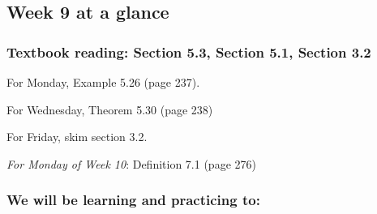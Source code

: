 

\subsection*{Week 9 at a glance}

\vspace{-10pt}

\subsubsection*{Textbook reading: Section 5.3, Section 5.1, Section 3.2}

\vspace{-10pt}

For Monday, Example 5.26 (page 237).

For Wednesday,  Theorem 5.30 (page 238) 

For Friday, skim section 3.2.

{\it For Monday of Week 10}: Definition 7.1 (page 276)
\vspace{-20pt}

\subsubsection*{We will be learning and practicing to:}

\vspace{-20pt}

